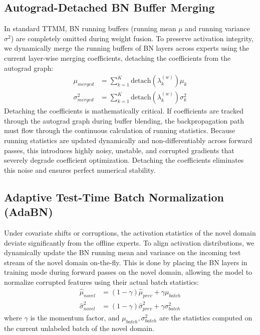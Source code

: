 \documentclass{article}
\begin{document}
\subsection{Autograd-Detached BN Buffer Merging}
In standard TTMM, BN running buffers (running mean $\mu$ and running variance $\sigma^2$) are completely omitted during weight fusion. To preserve activation integrity, we dynamically merge the running buffers of BN layers across experts using the current layer-wise merging coefficients, detaching the coefficients from the autograd graph:
\begin{align}
\mu_{merged} &= \sum_{k=1}^K \text{detach}(\lambda^{(w)}_k) \mu_k \\
\sigma^2_{merged} &= \sum_{k=1}^K \text{detach}(\lambda^{(w)}_k) \sigma^2_k
\end{align}
Detaching the coefficients is mathematically critical. If coefficients are tracked through the autograd graph during buffer blending, the backpropagation path must flow through the continuous calculation of running statistics. Because running statistics are updated dynamically and non-differentiably across forward passes, this introduces highly noisy, unstable, and corrupted gradients that severely degrade coefficient optimization. Detaching the coefficients eliminates this noise and ensures perfect numerical stability.

\subsection{Adaptive Test-Time Batch Normalization (AdaBN)}
Under covariate shifts or corruptions, the activation statistics of the novel domain deviate significantly from the offline experts. To align activation distributions, we dynamically update the BN running mean and variance on the incoming test stream of the novel domain on-the-fly. This is done by placing the BN layers in training mode during forward passes on the novel domain, allowing the model to normalize corrupted features using their actual batch statistics:
\begin{align}
\hat{\mu}_{novel} &= (1 - \gamma) \hat{\mu}_{prev} + \gamma \mu_{batch} \\
\hat{\sigma}^2_{novel} &= (1 - \gamma) \hat{\sigma}^2_{prev} + \gamma \sigma^2_{batch}
\end{align}
where $\gamma$ is the momentum factor, and $\mu_{batch}, \sigma^2_{batch}$ are the statistics computed on the current unlabeled batch of the novel domain.
\end{document}
